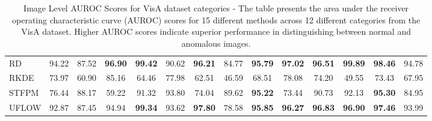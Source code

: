 \begin{table}[h!]
{\begin{tabular}{l*{13}{c}}
        RD & 94.22 & 87.52 & \textbf{96.90} & \textbf{99.42} & 90.62 & \textbf{96.21} & 84.77 & \textbf{95.79} & \textbf{97.02} & \textbf{96.51} &\textbf{ 99.89} & \textbf{98.46} & 94.78 \\
        RKDE & 73.97 & 60.90 & 85.16 & 64.46 & 77.98 & 62.51 & 46.59 & 68.51 & 78.08 & 74.20 & 49.55 & 73.43 & 67.95 \\
        STFPM & 76.44 & 88.17 & 59.22 & 91.32 & 93.80 & 74.04 & 89.62 & \textbf{95.22} & 73.44 & 90.73 & 92.13 & \textbf{95.30} & 84.95 \\
        UFLOW & 92.87 & 87.45 & 94.94 & \textbf{99.34} & 93.62 & \textbf{97.80} & 78.58 & \textbf{95.85} & \textbf{96.27} & \textbf{96.83} & \textbf{96.90} & \textbf{97.46} & 93.99 \\
        \bottomrule
        \end{tabular}
    }
    \caption{Image Level AUROC Scores for VisA\cite{Zou_2022_visa} dataset categories - The table presents the area under the receiver operating characteristic curve (AUROC) scores for 15 different methods across 12 different categories from the VisA dataset. Higher AUROC scores indicate superior performance in distinguishing between normal and anomalous images.}
    \label{table:VisA Image AUROC}
\end{table}